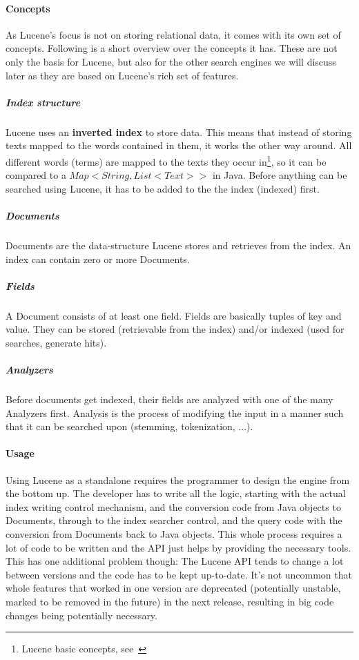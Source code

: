 \paragraph{Concepts}

As Lucene's focus is not on storing relational data, it comes with its own set of concepts. Following is a short overview over the concepts it has. These are not only the basis for Lucene, but also for the other search engines we will discuss later as they are based on Lucene's rich set of features.

\subparagraph{Index structure}
Lucene uses an \textbf{inverted index} to store data. This means that instead of storing texts mapped to the words contained in them, it works the other way around. All different words (terms) are mapped to the texts they occur in\footnote{Lucene basic concepts, see~\cite{lucene_basic_concepts}}, so it can be compared to a \(Map<String, List<Text>>\) in Java. Before anything can be searched using Lucene, it has to be added to the the index (indexed) first.

\subparagraph{Documents}
Documents are the data-structure Lucene stores and retrieves from the index. An index can contain zero or more Documents.

\subparagraph{Fields}
A Document consists of at least one field. Fields are basically tuples of key and value. They can be stored (retrievable from the index) and/or indexed (used for searches, generate hits).

\subparagraph{Analyzers}
Before documents get indexed, their fields are analyzed with one of the many Analyzers first. Analysis is the process of modifying the input in a manner such that it can be searched upon (stemming, tokenization, ...).

\paragraph{Usage}
Using Lucene as a standalone requires the programmer to design the engine from the bottom up. The developer has to write all the logic, starting with the actual index writing control mechanism, and the conversion code from Java objects to Documents, through to the index searcher control, and the query code with the conversion from Documents back to Java objects. This whole process requires a lot of code to be written and the API just helps by providing the necessary tools. This has one additional problem though: The Lucene API tends to change a lot between versions and the code has to be kept up-to-date. It's not uncommon that whole features that worked in one version are deprecated (potentially unstable, marked to be removed in the future) in the next release, resulting in big code changes being potentially necessary.

